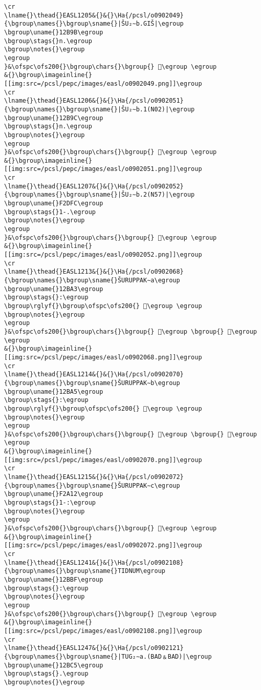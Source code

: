 \begin{verbatim}
\cr
\lname{}\thead{}EASL1205&{}&{}\Ha{/pcsl/o0902049}{\bgroup\names{}\bgroup\sname{}|ŠU₂∼b.GIŠ|\egroup
\bgroup\uname{}12B9B\egroup
\bgroup\stags{}n.\egroup
\bgroup\notes{}\egroup
\egroup
}&\ofspc\ofs200{}\bgroup\chars{}\bgroup{} 𒮛\egroup \egroup
&{}\bgroup\imageinline{}[[img:src=/pcsl/pepc/images/easl/o0902049.png]]\egroup
\cr
\lname{}\thead{}EASL1206&{}&{}\Ha{/pcsl/o0902051}{\bgroup\names{}\bgroup\sname{}|ŠU₂∼b.1(N02)|\egroup
\bgroup\uname{}12B9C\egroup
\bgroup\stags{}n.\egroup
\bgroup\notes{}\egroup
\egroup
}&\ofspc\ofs200{}\bgroup\chars{}\bgroup{} 𒮜\egroup \egroup
&{}\bgroup\imageinline{}[[img:src=/pcsl/pepc/images/easl/o0902051.png]]\egroup
\cr
\lname{}\thead{}EASL1207&{}&{}\Ha{/pcsl/o0902052}{\bgroup\names{}\bgroup\sname{}|ŠU₂∼b.2(N57)|\egroup
\bgroup\uname{}F2DFC\egroup
\bgroup\stags{}1-.\egroup
\bgroup\notes{}\egroup
\egroup
}&\ofspc\ofs200{}\bgroup\chars{}\bgroup{} 󲷼\egroup \egroup
&{}\bgroup\imageinline{}[[img:src=/pcsl/pepc/images/easl/o0902052.png]]\egroup
\cr
\lname{}\thead{}EASL1213&{}&{}\Ha{/pcsl/o0902068}{\bgroup\names{}\bgroup\sname{}ŠURUPPAK∼a\egroup
\bgroup\uname{}12BA3\egroup
\bgroup\stags{}:\egroup
\bgroup\rglyf{}\bgroup\ofspc\ofs200{} 𒮣\egroup \egroup
\bgroup\notes{}\egroup
\egroup
}&\ofspc\ofs200{}\bgroup\chars{}\bgroup{} 𒮢\egroup \bgroup{} 𒮣\egroup \egroup
&{}\bgroup\imageinline{}[[img:src=/pcsl/pepc/images/easl/o0902068.png]]\egroup
\cr
\lname{}\thead{}EASL1214&{}&{}\Ha{/pcsl/o0902070}{\bgroup\names{}\bgroup\sname{}ŠURUPPAK∼b\egroup
\bgroup\uname{}12BA5\egroup
\bgroup\stags{}:\egroup
\bgroup\rglyf{}\bgroup\ofspc\ofs200{} 𒮥\egroup \egroup
\bgroup\notes{}\egroup
\egroup
}&\ofspc\ofs200{}\bgroup\chars{}\bgroup{} 𒮤\egroup \bgroup{} 𒮥\egroup \egroup
&{}\bgroup\imageinline{}[[img:src=/pcsl/pepc/images/easl/o0902070.png]]\egroup
\cr
\lname{}\thead{}EASL1215&{}&{}\Ha{/pcsl/o0902072}{\bgroup\names{}\bgroup\sname{}ŠURUPPAK∼c\egroup
\bgroup\uname{}F2A12\egroup
\bgroup\stags{}1-:\egroup
\bgroup\notes{}\egroup
\egroup
}&\ofspc\ofs200{}\bgroup\chars{}\bgroup{} 󲨒\egroup \egroup
&{}\bgroup\imageinline{}[[img:src=/pcsl/pepc/images/easl/o0902072.png]]\egroup
\cr
\lname{}\thead{}EASL1241&{}&{}\Ha{/pcsl/o0902108}{\bgroup\names{}\bgroup\sname{}TIDNUM\egroup
\bgroup\uname{}12BBF\egroup
\bgroup\stags{}:\egroup
\bgroup\notes{}\egroup
\egroup
}&\ofspc\ofs200{}\bgroup\chars{}\bgroup{} 𒮿\egroup \egroup
&{}\bgroup\imageinline{}[[img:src=/pcsl/pepc/images/easl/o0902108.png]]\egroup
\cr
\lname{}\thead{}EASL1247&{}&{}\Ha{/pcsl/o0902121}{\bgroup\names{}\bgroup\sname{}|TUG₂∼a.(BAD﹠BAD)|\egroup
\bgroup\uname{}12BC5\egroup
\bgroup\stags{}.\egroup
\bgroup\notes{}\egroup

\end{verbatim}

